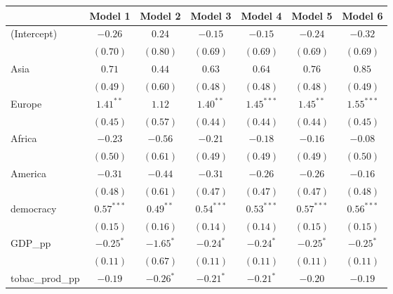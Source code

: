 
\begin{table}[!h]
\begin{center}
\begin{tabular}{l c c c c c c }
\toprule
 & Model 1 & Model 2 & Model 3 & Model 4 & Model 5 & Model 6 \\
\midrule
(Intercept)             & $-0.26$      & $0.24$      & $-0.15$      & $-0.15$      & $-0.24$      & $-0.32$      \\
                        & $(0.70)$     & $(0.80)$    & $(0.69)$     & $(0.69)$     & $(0.69)$     & $(0.69)$     \\
Asia                    & $0.71$       & $0.44$      & $0.63$       & $0.64$       & $0.76$       & $0.85$       \\
                        & $(0.49)$     & $(0.60)$    & $(0.48)$     & $(0.48)$     & $(0.48)$     & $(0.49)$     \\
Europe                  & $1.41^{**}$  & $1.12$      & $1.40^{**}$  & $1.45^{***}$ & $1.45^{**}$  & $1.55^{***}$ \\
                        & $(0.45)$     & $(0.57)$    & $(0.44)$     & $(0.44)$     & $(0.44)$     & $(0.45)$     \\
Africa                  & $-0.23$      & $-0.56$     & $-0.21$      & $-0.18$      & $-0.16$      & $-0.08$      \\
                        & $(0.50)$     & $(0.61)$    & $(0.49)$     & $(0.49)$     & $(0.49)$     & $(0.50)$     \\
America                 & $-0.31$      & $-0.44$     & $-0.31$      & $-0.26$      & $-0.26$      & $-0.16$      \\
                        & $(0.48)$     & $(0.61)$    & $(0.47)$     & $(0.47)$     & $(0.47)$     & $(0.48)$     \\
democracy               & $0.57^{***}$ & $0.49^{**}$ & $0.54^{***}$ & $0.53^{***}$ & $0.57^{***}$ & $0.56^{***}$ \\
                        & $(0.15)$     & $(0.16)$    & $(0.14)$     & $(0.14)$     & $(0.15)$     & $(0.15)$     \\
GDP\_pp                 & $-0.25^{*}$  & $-1.65^{*}$ & $-0.24^{*}$  & $-0.24^{*}$  & $-0.25^{*}$  & $-0.25^{*}$  \\
                        & $(0.11)$     & $(0.67)$    & $(0.11)$     & $(0.11)$     & $(0.11)$     & $(0.11)$     \\
tobac\_prod\_pp         & $-0.19$      & $-0.26^{*}$ & $-0.21^{*}$  & $-0.21^{*}$  & $-0.20$      & $-0.19$      \\

\end{tabular}
\end{center}
\end{table}
